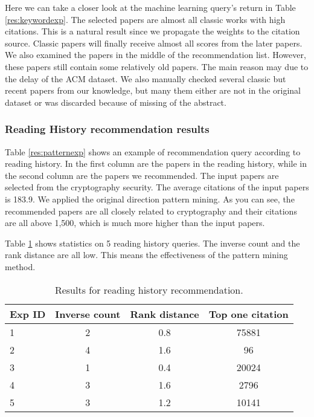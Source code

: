 Here we can take a closer look at the machine learning query's return in Table \ref{res:keywordexp}. The selected papers are almost all classic works with high citations. This is a natural result since we propagate the weights to the citation source. Classic papers will finally receive almost all scores from the later papers. We also examined the papers in the middle of the recommendation list. However, these papers still contain some relatively old papers. The main reason may due to the delay of the ACM dataset. We also manually checked several classic but recent papers from our knowledge, but many them either are not in the original dataset or was discarded because of missing of the abstract. 

\subsubsection{Reading History recommendation results}

Table \ref{res:patternexp} shows an example of recommendation query according to reading history. In the first column are the papers in the reading history, while in the second column are the papers we recommended. The input papers are selected from the cryptography security. The average citations of the input papers is 183.9. We applied the original direction pattern mining. As you can see, the recommended papers are all closely related to cryptography and their citations are all above 1,500, which is much more higher than the input papers.

Table \ref{res:patternall} shows statistics on 5 reading history queries. The inverse count and the rank distance are all low. This means the effectiveness of the pattern mining method.

\begin{table}
	\centering
	\begin{tabular}{lccc}
		\toprule
		\textbf{Exp ID} 	& \textbf{Inverse count} 	& \textbf{Rank distance} &\textbf{Top one citation}\\ \midrule
		1	& 2	& 0.8		&75881\\
		2	& 4	& 1.6		& 96 \\
		3	& 1	& 0.4		&20024 \\
		4	& 3	& 1.6		&2796\\
		5	& 3	& 1.2		&10141\\
		\bottomrule
	\end{tabular}
	\vspace{3mm}
	\caption{Results for reading history recommendation. }
	\label{res:patternall}
\end{table}

